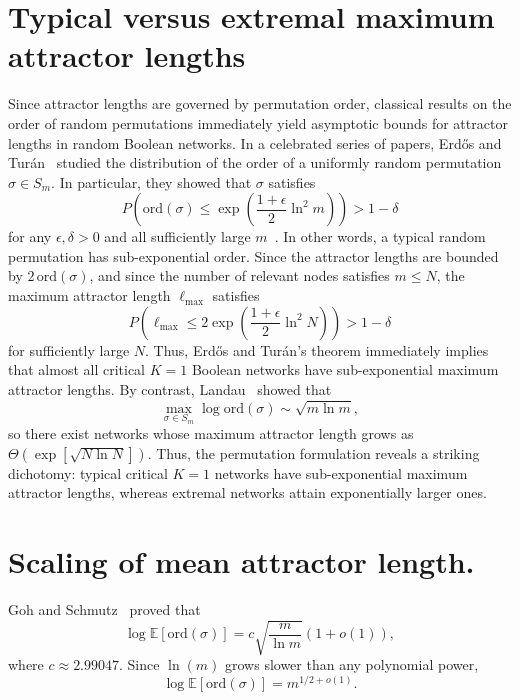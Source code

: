 \documentclass[11pt, reqno]{elsarticle}%
\theoremstyle{plain}
\begin{document}
\section*{Typical versus extremal maximum attractor lengths}
Since attractor lengths are governed by permutation order, classical results on the order of random permutations immediately yield asymptotic bounds for attractor lengths in random Boolean networks. In a celebrated series of papers, Erd\H{o}s and Tur\'an~\cite{ErdosTuran1965,ErdosTuran1967a,ErdosTuran1967b,ErdosTuran1968} 
studied the distribution of the order of a uniformly random permutation 
$\sigma\in S_m$.
In particular, they showed that $\sigma$ satisfies
\begin{equation}
  P\!\left(\mathrm{ord}(\sigma)\le \exp\!\left(\frac{1+\epsilon}{2}\ln^2 m\right)\right) > 1-\delta
  \label{eq:erdos_turan}
\end{equation}
for any $\epsilon,\delta>0$ and all sufficiently large $m$~\cite{ErdosTuran1965}.
In other words, a typical random permutation has sub-exponential order. Since the attractor lengths are bounded by $2\,\mathrm{ord}(\sigma)$, and since the number of relevant nodes satisfies $m\le N$, the maximum attractor length $\ell_{\max}$ satisfies
\begin{equation}
  P\!\left(\ell_{\max} \le 2\exp\!\left(\frac{1+\epsilon}{2}\ln^2 N\right)\right) > 1-\delta
  \label{eq:period_bound_N}
\end{equation}
for sufficiently large $N$. Thus, Erd\H{o}s and Tur\'an's theorem immediately implies that almost all critical $K=1$ Boolean networks have sub-exponential maximum attractor lengths. By contrast, Landau~\cite{Landau1903} showed that 
\begin{equation}
    \max_{\sigma\in S_m}\log\mathrm{ord}(\sigma)\sim\sqrt{m\ln m},
\end{equation}
so there exist networks whose maximum attractor length grows as $\Theta(\exp[\sqrt{N\ln N}])$. Thus, the permutation formulation reveals a striking dichotomy: typical critical $K=1$ networks have sub-exponential maximum attractor lengths, whereas extremal networks attain exponentially larger ones.


\section*{Scaling of mean attractor length.}


Goh and Schmutz~\cite{schmutz} proved that
\begin{equation}
\log\mathbb E[\mathrm{ord} (\sigma)] = c\sqrt{\frac{m}{\ln m}}(1+o(1)),
\end{equation}
where $c\approx2.99047$. Since $\ln(m)$ grows slower than any polynomial power,
\begin{equation}
\log\mathbb E[\mathrm{ord} (\sigma)] = m^{1/2+o(1)}.
\end{equation}
\end{document}
